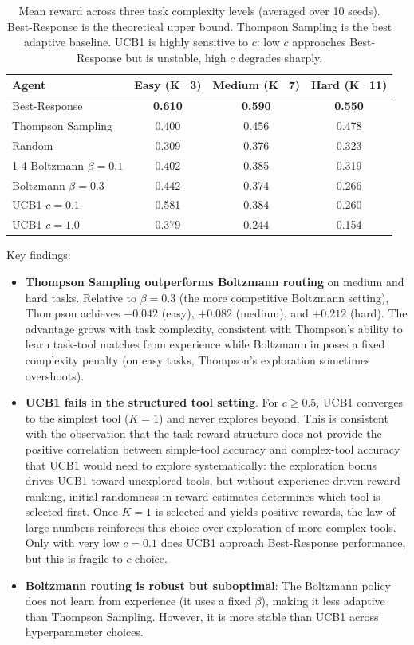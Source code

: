 \documentclass[12pt]{article}
\theoremstyle{definition}
\begin{document}
\begin{table}[htb]
  \centering
  \begin{tabular}{lccc}
    \toprule
    Agent & Easy (K=3) & Medium (K=7) & Hard (K=11) \\
    \midrule
    Best-Response & \textbf{0.610} & \textbf{0.590} & \textbf{0.550} \\
    Thompson Sampling & 0.400 & 0.456 & 0.478 \\
    Random & 0.309 & 0.376 & 0.323 \\
    \cmidrule(lr){1-4}
    Boltzmann $\beta=0.1$ & 0.402 & 0.385 & 0.319 \\
    Boltzmann $\beta=0.3$ & 0.442 & 0.374 & 0.266 \\
    UCB1 $c=0.1$ & 0.581 & 0.384 & 0.260 \\
    UCB1 $c=1.0$ & 0.379 & 0.244 & 0.154 \\
    \bottomrule
  \end{tabular}
  \caption{Mean reward across three task complexity levels (averaged over 10 seeds). Best-Response is the theoretical upper bound. Thompson Sampling is the best adaptive baseline. UCB1 is highly sensitive to $c$: low $c$ approaches Best-Response but is unstable, high $c$ degrades sharply.}
  \label{tab:ucb-thompson}
\end{table}

Key findings:

\begin{itemize}
  \item \textbf{Thompson Sampling outperforms Boltzmann routing} on medium and hard tasks. Relative to $\beta=0.3$ (the more competitive Boltzmann setting), Thompson achieves $-0.042$ (easy), $+0.082$ (medium), and $+0.212$ (hard). The advantage grows with task complexity, consistent with Thompson's ability to learn task-tool matches from experience while Boltzmann imposes a fixed complexity penalty (on easy tasks, Thompson's exploration sometimes overshoots).
  \item \textbf{UCB1 fails in the structured tool setting}. For $c \geq 0.5$, UCB1 converges to the simplest tool ($K=1$) and never explores beyond. This is consistent with the observation that the task reward structure does not provide the positive correlation between simple-tool accuracy and complex-tool accuracy that UCB1 would need to explore systematically: the exploration bonus drives UCB1 toward unexplored tools, but without experience-driven reward ranking, initial randomness in reward estimates determines which tool is selected first. Once $K=1$ is selected and yields positive rewards, the law of large numbers reinforces this choice over exploration of more complex tools. Only with very low $c=0.1$ does UCB1 approach Best-Response performance, but this is fragile to $c$ choice.
  \item \textbf{Boltzmann routing is robust but suboptimal}: The Boltzmann policy does not learn from experience (it uses a fixed $\beta$), making it less adaptive than Thompson Sampling. However, it is more stable than UCB1 across hyperparameter choices.
\end{itemize}
\end{document}
